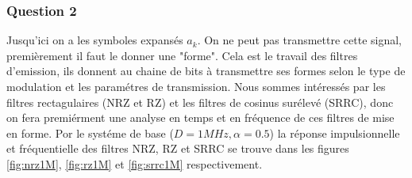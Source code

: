 \documentclass[a4paper,11pt]{article}
\begin{document}
\subsubsection*{Question 2}
Jusqu'ici on a les symboles expansés $a_k$. On ne peut pas transmettre cette signal, premièrement il faut le donner une "forme". Cela est le travail des filtres d'emission, ils donnent au chaine de bits à transmettre ses formes selon le type de modulation et les paramétres de transmission.
Nous sommes intéressés par les filtres rectagulaires (NRZ et RZ) et les filtres de cosinus surélevé (SRRC), donc on fera premiérment une analyse en temps et en fréquence de ces filtres de mise en forme.
Por le systéme de base ($D=1MHz, \alpha=0.5$) la réponse impulsionnelle et fréquentielle des filtres NRZ, RZ et SRRC se trouve dans les figures \ref{fig:nrz1M}, \ref{fig:rz1M} et \ref{fig:srrc1M} respectivement.
\end{document}
